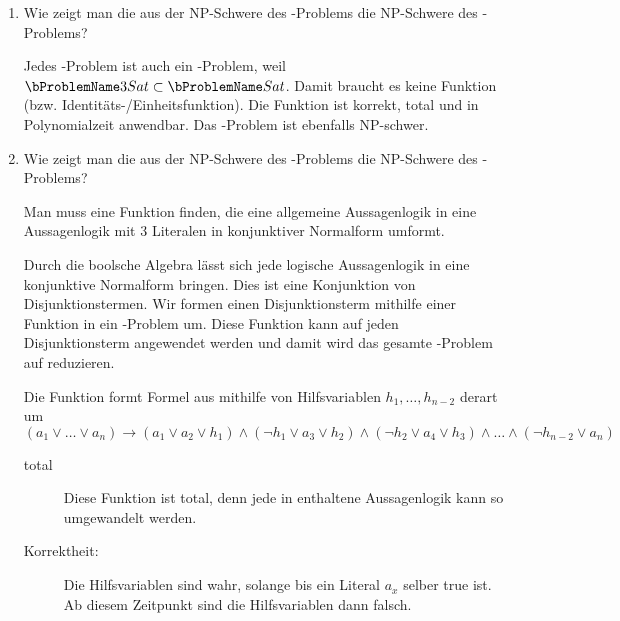 \documentclass{bschlangaul-aufgabe}
\begin{document}
\begin{enumerate}


\item Wie zeigt man die aus der NP-Schwere des \dreiSat-Problems die
NP-Schwere des \sat-Problems?

\begin{bAntwort}
\bPolynomiellReduzierbar{\dreiSat}{\sat}

Jedes \dreiSat-Problem ist auch ein \sat-Problem,
weil $\dreiSat \subset \sat$. Damit braucht es keine Funktion (bzw.
Identitäts-/Einheitsfunktion). Die Funktion ist korrekt, total und in
Polynomialzeit anwendbar. Das \sat-Problem ist ebenfalls NP-schwer.
\end{bAntwort}


\item Wie zeigt man die aus der NP-Schwere des \sat-Problems die
NP-Schwere des \dreiSat-Problems?

\begin{bAntwort}
\bPolynomiellReduzierbar{\sat}{\dreiSat}

Man muss eine Funktion ﬁnden, die eine allgemeine Aussagenlogik in eine
Aussagenlogik mit 3 Literalen in konjunktiver Normalform umformt.

Durch die boolsche Algebra lässt sich jede logische Aussagenlogik in
eine konjunktive Normalform bringen. Dies ist eine Konjunktion von
Disjunktionstermen. Wir formen einen Disjunktionsterm mithilfe einer
Funktion in ein \dreiSat-Problem um. Diese Funktion kann auf jeden
Disjunktionsterm angewendet werden und damit wird das gesamte
\sat-Problem auf \dreiSat{} reduzieren.

Die Funktion formt Formel aus \sat mithilfe von Hilfsvariablen
%
$h_1 , \dots , h_{n-2}$
%
derart um
%
$(a_1 \lor \dots \lor a_n) \rightarrow
(a_1 \lor a_2 \lor h_1) \land
(\neg h_1 \lor a_3 \lor h_2) \land
(\neg h_2 \lor a_4 \lor h_3) \land
\dots \land
(\neg h_{n-2} \lor a_n )$

\begin{description}
\item[total]

Diese Funktion ist total, denn jede in \sat enthaltene Aussagenlogik
kann so umgewandelt werden.

\item[Korrektheit:]

Die Hilfsvariablen sind wahr, solange bis ein Literal $a_x$
selber true ist. Ab diesem Zeitpunkt sind die Hilfsvariablen dann
falsch.


\end{description}
\end{bAntwort}
\end{enumerate}
\end{document}
